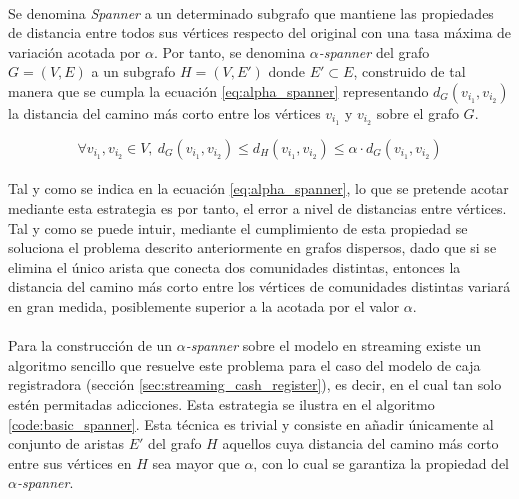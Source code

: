 \documentclass{subfiles}
\begin{document}
        \paragraph{}
        Se denomina \emph{Spanner} a un determinado subgrafo que mantiene las propiedades de distancia entre todos sus vértices respecto del original con una tasa máxima de variación acotada por $\alpha$. Por tanto, se denomina \emph{$\alpha$-spanner} del grafo $G = (V, E)$ a un subgrafo $H = (V, E')$ donde $E' \subset E$, construido de tal manera que se cumpla la ecuación \eqref{eq:alpha_spanner} representando $d_G(v_{i_1},v_{i_2})$ la distancia del camino más corto entre los vértices $v_{i_1}$ y $v_{i_2}$ sobre el grafo $G$.

        \begin{equation}
        \label{eq:alpha_spanner}
          \forall v_{i_1}, v_{i_2} \in V, \ d_G(v_{i_1},v_{i_2}) \leq d_H(v_{i_1},v_{i_2}) \leq \alpha \cdot d_G(v_{i_1},v_{i_2})
        \end{equation}

        \paragraph{}
        Tal y como se indica en la ecuación \eqref{eq:alpha_spanner}, lo que se pretende acotar mediante esta estrategia es por tanto, el error a nivel de distancias entre vértices. Tal y como se puede intuir, mediante el cumplimiento de esta propiedad se soluciona el problema descrito anteriormente en grafos dispersos, dado que si se elimina el único arista que conecta dos comunidades distintas, entonces la distancia del camino más corto entre los vértices de comunidades distintas variará en gran medida, posiblemente superior a la acotada por el valor $\alpha$.

        \paragraph{}
        Para la construcción de un \emph{$\alpha$-spanner} sobre el modelo en streaming existe un algoritmo sencillo que resuelve este problema para el caso del modelo de caja registradora (sección \ref{sec:streaming_cash_register}), es decir, en el cual tan solo estén permitadas adicciones. Esta estrategia se ilustra en el algoritmo \ref{code:basic_spanner}. Esta técnica es trivial y consiste en añadir únicamente al conjunto de aristas $E'$ del grafo $H$ aquellos cuya distancia del camino más corto entre sus vértices en $H$ sea mayor que $\alpha$, con lo cual se garantiza la propiedad del \emph{$\alpha$-spanner}.
\end{document}
